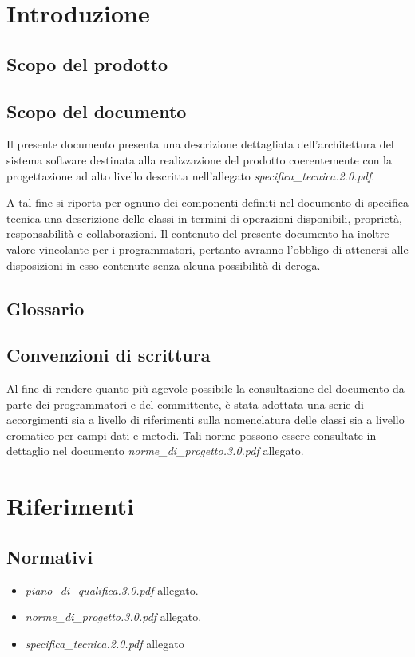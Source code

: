 \section{Introduzione}
\subsection{Scopo del prodotto}
\purpose

\subsection{Scopo del documento}
Il presente documento presenta una descrizione dettagliata dell'architettura del sistema software destinata alla realizzazione del prodotto \caName{} coerentemente con la progettazione ad alto livello descritta nell'allegato \textit{specifica\_tecnica.2.0.pdf}.

A tal fine si riporta per ognuno dei componenti definiti nel documento di specifica tecnica una descrizione delle classi in termini di operazioni disponibili, proprietà, responsabilità e collaborazioni. Il contenuto del presente documento ha inoltre valore vincolante per i programmatori, pertanto avranno l'obbligo di attenersi alle disposizioni in esso contenute senza alcuna possibilità di deroga.

\subsection{Glossario}
\glossaryIntro

\subsection{Convenzioni di scrittura}
Al fine di rendere quanto più agevole possibile la consultazione del documento da parte dei programmatori e del committente, è stata adottata una serie di accorgimenti sia a livello di riferimenti sulla nomenclatura delle classi sia a livello cromatico per campi dati e metodi. 
Tali norme possono essere consultate in dettaglio nel documento \textit{norme\_di\_progetto.3.0.pdf} allegato.
\clearpage

\section{Riferimenti}
\subsection{Normativi}
\begin{itemize}
\item[] \textit{piano\_di\_qualifica.3.0.pdf} allegato.
\item[] \textit{norme\_di\_progetto.3.0.pdf} allegato.
\item[] \textit{specifica\_tecnica.2.0.pdf} allegato
\end{itemize}


